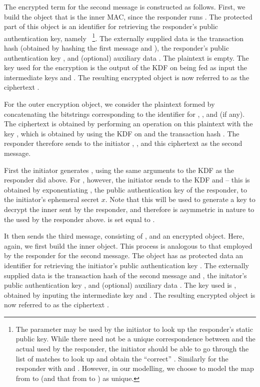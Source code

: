 {The encrypted term for the second message is constructed as follows. First, we
build the \mCose{} object that is the inner MAC, since the responder runs
\mStat. The protected part of this object is an identifier for retrieving the
responder's public authentication key, namely \mIdcredr~\footnote{The
\mIdcredr{} parameter may be used by the initiator to look up the responder's
static public key. While there need not be a unique correspondence between
\mIdcredr{} and the actual \mCredr{} used by the responder, the initiator should
be able to go through the list of matches to look up and obtain the ``correct''
\mCredr. Similarly for the responder with \mIdcredi{} and \mCredi. However, in
our modelling, we choose to model the map from \mIdcredr{} to \mCredr{} (and
that from \mIdcredi{} to \mCredi) as unique.}. The externally supplied data is
the transaction hash \mTHtwo{} (obtained by hashing the first message and \mGy),
the responder's public authentication key \mCredr, and (optional) auxiliary data
\mADtwo. The plaintext is empty. The key used for the encryption \mKtwom{} is
the output of the KDF on being fed as input the intermediate keys \mPRKthree{} and \mTHtwo. The resulting encrypted object is now referred to as the ciphertext \mMactwo. 

For the outer encryption object, we consider the plaintext formed by
concatenating the bitstrings corresponding to the identifier for \mCredr,
\mMactwo, and \mADtwo{} (if any). The ciphertext is obtained by performing an
\mXor{} operation on this plaintext with the key \mKtwoe, which is obtained by
using the KDF on \mPRKtwo{} and the transaction hash \mTHtwo. The responder therefore sends to the initiator \mGy, \mCr, and this ciphertext as the second message.

First the initiator generates \mPRKtwo, using the same arguments to the KDF as
the responder did above. For \mPRKthree, however, the initiator sends to the KDF
\mPRKtwo{} and \mGrx{} -- this \mGrx{} is obtained by exponentiating \mCredr,
the public authentication key of the responder, to the initiator's ephemeral
secret $x$. Note that this will be used to generate a key to decrypt the inner
\mMactwo{} sent by the responder, and therefore is asymmetric in nature to the
\mGrx{} used by the responder above. \mPRKfour{} is set equal to \mPRKthree. 

It then sends the third message, consisting of \mCr, and an encrypted object.
Here, again, we first build the inner \mCose{} object. This process is analogous
to that employed by the responder for the second message. The \mCose{} object
has as protected data an identifier for retrieving the initiator's public
authentication key \mCredi. The externally supplied data is the transaction hash
\mTHthree of the second message and \mTHtwo,  the initator's public
authentication key \mCredi, and (optional) auxiliary data \mADthree. The key
used is \mKthreem, obtained by inputing the intermediate key \mPRKthree{} and \mTHthree. The resulting encrypted object is now referred to as the ciphertext \mMacthree. 

}
